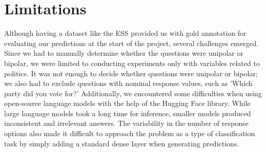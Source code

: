 \section*{Limitations}
Although having a dataset like the ESS provided us with gold annotation for evaluating our predictions at the start of the project, several challenges emerged. Since we had to manually determine whether the questions were unipolar or bipolar, we were limited to conducting experiments only with variables related to politics. It was not enough to decide whether questions were unipolar or bipolar; we also had to exclude questions with nominal response values, such as 'Which party did you vote for?' Additionally, we encountered some difficulties when using open-source language models with the help of the Hugging Face library. While large language models took a long time for inference, smaller models produced inconsistent and irrelevant answers. The variability in the number of response options also made it difficult to approach the problem as a type of classification task by simply adding a standard dense layer when generating predictions.